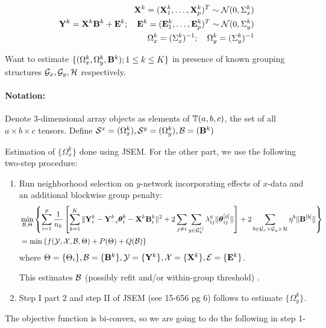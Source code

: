\documentclass[fleqn,11pt]{article}
\numberwithin{equation}{section}
\begin{document}
\begin{eqnarray}
{\mathbf{X}}^k = ({\mathbf{X}}^k_1, \ldots, {\mathbf{X}}^k_p)^T \sim {\cal{N}} (0, \Sigma^k_x)\\
{\mathbf{Y}}^k = {\mathbf{X}}^k {\mathbf{B}}^k + {\mathbf{E}}^k; \quad {\mathbf{E}}^k = ({\mathbf{E}}^k_1, \ldots, {\mathbf{E}}^k_p)^T \sim {\cal{N}} (0, \Sigma^k_y)\\
\Omega^k_x = (\Sigma^k_x)^{-1}; \quad \Omega^k_y = (\Sigma^k_y)^{-1}
\end{eqnarray}

Want to estimate $\{ (\Omega^k_x, \Omega^k_y, {\mathbf{B}}^k); 1 \leq k \leq K \}$ in presence of known grouping structures ${\cal{G}}_x, {\cal{G}}_y, {\cal{H}}$ respectively. 

\paragraph{Notation:} Denote 3-dimensional array objects as elements of ${\mathbb{T}}(a,b,c)$, the set of all $a \times b \times c$ tensors.
Define ${\cal{S}}^x = (\Omega^k_x), {\cal{S}}^y = (\Omega^k_y), {\cal{B}} = ({\mathbf{B}}^k)$


Estimation of $\{ \Omega_x^k \}$ done using JSEM. For the other part, we use the following two-step procedure:

\begin{enumerate}
\item Run neighborhood selection on $y$-network incorporating effects of $x$-data and an additional blockwise group penalty:
%
\begin{align}
& \min_{{\cal{B}}, \Theta} \left\{ \sum_{i=1}^p  \frac{1}{n_k} \left[ \sum_{k=1}^K \| {\mathbf{Y}}^k_i - {\mathbf{Y}}_{-i}^k {\boldsymbol{\theta}}_i^k - {\mathbf{X}}^k {\mathbf{B}}_i^k \|^2 + 2 \sum_{j \neq i} \sum_{g \in {\cal{G}}_y^{ij}} \lambda_{ij}^g \| {\boldsymbol{\theta}}_{ij}^{[g]} \| \right] + 2 \sum_{b \in {\cal{G}}_x \times {\cal{G}}_y \times {\cal{H}}} \eta^b \| {\mathbf{B}}^{[b]} \| \right\}\\
&= \min \left\{ f ( {\cal{Y}}, {\cal{X}}, {\cal{B}}, \Theta) + P (\Theta) + Q ({\cal{B}}) \right\} 
\end{align}
%
where $\Theta = \{ \Theta_i \}, {\cal{B}} = \{ {\mathbf{B}}^k \}, {\cal{Y}} = \{ {\mathbf{Y}}^k \}, {\cal{X}} = \{ {\mathbf{X}}^k \}, {\cal{E}} = \{ {\mathbf{E}}^k \}$.

This estimates ${\cal{B}}$ { \colrbf (possibly refit and/or within-group threshold) }.

\item Step I part 2 and step II of JSEM (see 15-656 pg 6) follows to estimate $\{ \Omega_y^k \}$.
\end{enumerate}

The objective function is bi-convex, so we are going to do the following in step 1-
\end{document}
